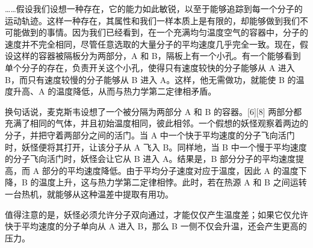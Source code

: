 ……假设我们设想一种存在，它的能力如此敏锐，以至于能够追踪到每一个分子的运动轨迹。这样一种存在，其属性和我们一样本质上是有限的，却能够做到我们不可能做到的事情。因为我们已经看到，在一个充满均匀温度空气的容器中，分子的速度并不完全相同，尽管任意选取的大量分子的平均速度几乎完全一致。现在，假设这样的容器被隔板分为两部分，A 和 B，隔板上有一个小孔。有一个能够看到单个分子的存在，负责开关这个小孔，使得只有速度较快的分子能够从 A 进入 B，而只有速度较慢的分子能够从 B 进入 A。这样，他无需做功，就能使 B 的温度升高、A 的温度降低，从而与热力学第二定律相矛盾。

换句话说，麦克斯韦设想了一个被分隔为两部分 A 和 B 的容器。[6][8] 两部分都充满了相同的气体，并且初始温度相同，彼此相邻。一个假想的妖怪观察着两边的分子，并把守着两部分之间的活门。当 A 中一个快于平均速度的分子飞向活门时，妖怪便将其打开，让该分子从 A 飞入 B。同样地，当 B 中一个慢于平均速度的分子飞向活门时，妖怪会让它从 B 进入 A。结果是，B 部分分子的平均速度提高，而 A 部分的平均速度降低。由于平均分子速度对应于温度，因此 A 的温度下降，B 的温度上升，这与热力学第二定律相悖。此时，若在热源 A 和 B 之间运转一台热机，就能够从这种温差中提取有用功。

值得注意的是，妖怪必须允许分子双向通过，才能仅仅产生温度差；如果它仅允许快于平均速度的分子单向从 A 进入 B，那么 B 一侧不仅会升温，还会产生更高的压力。
